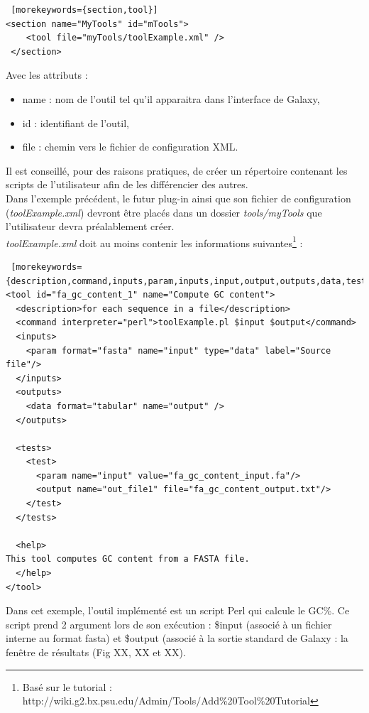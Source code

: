 \lstset{language=XML}
\begin{lstlisting} [morekeywords={section,tool}]
<section name="MyTools" id="mTools">
    <tool file="myTools/toolExample.xml" />
 </section>
 \end{lstlisting} 
 
Avec les attributs : 
\begin{itemize}
\item name : nom de l'outil tel qu'il apparaitra dans l'interface de Galaxy,
\item id : identifiant de l'outil,
\item file : chemin vers le fichier de configuration XML.\\
\end{itemize}

Il est conseillé, pour des raisons pratiques, de créer un répertoire contenant les scripts de l'utilisateur afin de les différencier des autres.\\ Dans l'exemple précédent, le futur plug-in ainsi que son fichier de configuration (\textit{toolExample.xml}) devront être placés dans un dossier \textit{tools/myTools} que l'utilisateur devra préalablement créer.\\

\newpage
\textit{toolExample.xml} doit au moins contenir les informations suivantes\footnote{Basé sur le tutorial : http://wiki.g2.bx.psu.edu/Admin/Tools/Add\%20Tool\%20Tutorial} : 

\lstset{language=XML}
\begin{lstlisting} [morekeywords={description,command,inputs,param,inputs,input,output,outputs,data,tests,test,help,tool}]
<tool id="fa_gc_content_1" name="Compute GC content">
  <description>for each sequence in a file</description>
  <command interpreter="perl">toolExample.pl $input $output</command>
  <inputs>
    <param format="fasta" name="input" type="data" label="Source file"/>
  </inputs>
  <outputs>
    <data format="tabular" name="output" />
  </outputs>

  <tests>
    <test>
      <param name="input" value="fa_gc_content_input.fa"/>
      <output name="out_file1" file="fa_gc_content_output.txt"/>
    </test>
  </tests>

  <help>
This tool computes GC content from a FASTA file.
  </help>
</tool>
 \end{lstlisting} 

Dans cet exemple, l'outil implémenté est un script Perl qui calcule le GC\%. Ce script prend 2 argument lors de son exécution : \$input (associé à un fichier interne au format fasta) et \$output (associé à la sortie standard de Galaxy : la fenêtre de résultats (Fig XX, XX et XX).\\





